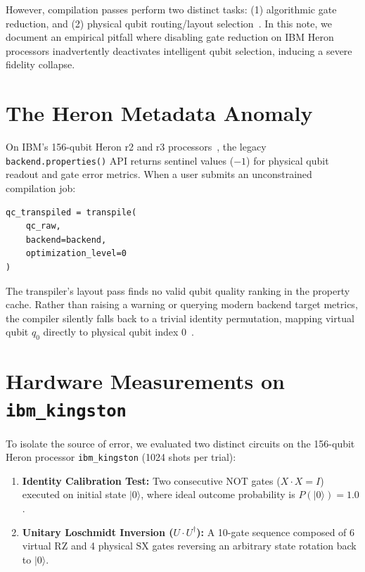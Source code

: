 \documentclass[10pt,twocolumn]{article}
\begin{document}
However, compilation passes perform two distinct tasks: (1) algorithmic gate reduction, and (2) physical qubit routing/layout selection~\cite{li2019tackling,sivarajah2020tket}. In this note, we document an empirical pitfall where disabling gate reduction on IBM Heron processors inadvertently deactivates intelligent qubit selection, inducing a severe fidelity collapse.

\section{The Heron Metadata Anomaly}

On IBM's 156-qubit Heron r2 and r3 processors~\cite{heron2024}, the legacy \texttt{backend.properties()} API returns sentinel values ($-1$) for physical qubit readout and gate error metrics. When a user submits an unconstrained compilation job:

\begin{verbatim}
qc_transpiled = transpile(
    qc_raw, 
    backend=backend, 
    optimization_level=0
)
\end{verbatim}

The transpiler's layout pass finds no valid qubit quality ranking in the property cache. Rather than raising a warning or querying modern backend target metrics, the compiler silently falls back to a trivial identity permutation, mapping virtual qubit $q_0$ directly to physical qubit index 0~\cite{cross2018qiskit}.

\section{Hardware Measurements on \texttt{ibm\_kingston}}

To isolate the source of error, we evaluated two distinct circuits on the 156-qubit Heron processor \texttt{ibm\_kingston} (1024 shots per trial):
\begin{enumerate}
  \item \textbf{Identity Calibration Test:} Two consecutive NOT gates ($X \cdot X = I$) executed on initial state $|0\rangle$, where ideal outcome probability is $P(|0\rangle) = 1.0$.
  \item \textbf{Unitary Loschmidt Inversion ($U \cdot U^{\dagger}$):} A 10-gate sequence composed of 6 virtual $\text{RZ}$ and 4 physical $\text{SX}$ gates reversing an arbitrary state rotation back to $|0\rangle$.
\end{enumerate}
\end{document}
